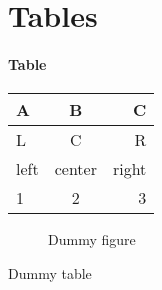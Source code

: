 \documentclass{article}
\begin{document}
\section{Tables}
\paragraph{Table}
\begin{tabular}{| l | c | r |}
\hline
A & B & C\\
\hline
L & C & R\\
left & center & right\\
\hline
1 & 2 & 3\\
\hline
\end{tabular}

\begin{figure}
  \caption{Dummy figure}
\end{figure}

\begin{table}
  \caption{Dummy table}
\end{table}
\newpage

\begin{appendix}
  \listoffigures
  \listoftables
\end{appendix}
\end{document}
